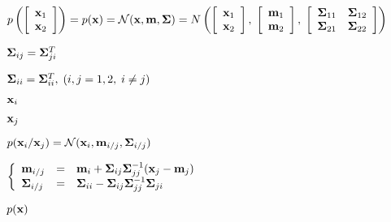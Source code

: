 \documentclass{article}
\def\lthtmlcheckvsize{\ifdim\ht\sizebox<\vsize 
  \ifdim\wd\sizebox<\hsize\expandafter\hfill\fi \expandafter\vfill
  \else\expandafter\vss\fi}%
\begin{document}
{\newpage\clearpage
{}%
$\displaystyle p\left( \left[\begin{array}{c}{\bf x}_1\\{\bf x}_2\end{array}\right]\right)
=p({\bf x})={\cal N}({\bf x},{\bf m},{\bf\Sigma})
=N\left(\left[\begin{array}{c}{\bf x}_1\\{\bf x}_2\end{array}\right],\;
\left[\begin{array}{c}{\bf m}_1 \\{\bf m}_2\end{array}\right],\;
\left[\begin{array}{cc}{\bf\Sigma}_{11} & {\bf\Sigma}_{12}\\
{\bf\Sigma}_{21}&{\bf\Sigma}_{22}\end{array}\right]\right)$%
\lthtmlindisplaymathZ
\lthtmlcheckvsize\clearpage}

{\newpage\clearpage
{}%
$ {\bf\Sigma}_{ij}={\bf\Sigma}_{ji}^T$%
\lthtmlindisplaymathZ
\lthtmlcheckvsize\clearpage}

{\newpage\clearpage
{}%
$ {\bf\Sigma}_{ii}={\bf\Sigma}_{ii}^T,
  \;(i,j=1,2,\;i\ne j)$%
\lthtmlindisplaymathZ
\lthtmlcheckvsize\clearpage}

{\newpage\clearpage
{}%
$ {\bf x}_i$%
\lthtmlindisplaymathZ
\lthtmlcheckvsize\clearpage}

{\newpage\clearpage
{}%
$ {\bf x}_j$%
\lthtmlindisplaymathZ
\lthtmlcheckvsize\clearpage}

{\newpage\clearpage
{}%
$\displaystyle p({\bf x}_i/{\bf x}_j)={\cal N}({\bf x}_i,{\bf m}_{i/j},{\bf\Sigma}_{i/j})$%
\lthtmlindisplaymathZ
\lthtmlcheckvsize\clearpage}

{\newpage\clearpage
{}%
$\displaystyle \left\{   \begin{array}{lcl}
{\bf m}_{i/j}&=&{\bf m}_i+{\bf\Sigma}_{ij}{\bf\Sigma}_{jj}^{-1} ({\bf x}_j-{\bf m}_j) \\
{\bf\Sigma}_{i/j}&=&{\bf\Sigma}_{ii}-{\bf\Sigma}_{ij}{\bf\Sigma}_{jj}^{-1}{\bf\Sigma}_{ji}
\end{array}\right.$%
\lthtmlindisplaymathZ
\lthtmlcheckvsize\clearpage}

{\newpage\clearpage
{}%
$\displaystyle p({\bf x})$%
\lthtmlindisplaymathZ
\lthtmlcheckvsize\clearpage}
\end{document}
